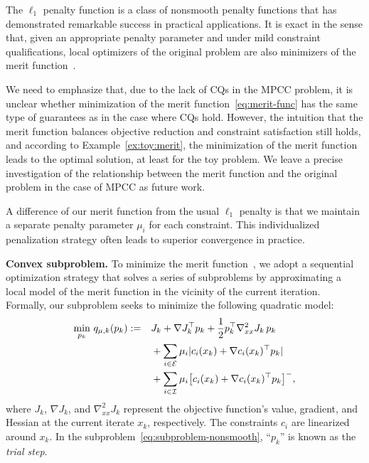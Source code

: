 
\begin{remark}
    The $\ell_1$ penalty function is a class of nonsmooth penalty functions that has demonstrated remarkable success in practical applications. It is exact in the sense that, given an appropriate penalty parameter and under mild constraint qualifications, local optimizers of the original problem are also minimizers of the merit function~\cite{Fletcher1983}.

    We need to emphasize that, due to the lack of CQs in the MPCC problem, it is unclear whether minimization of the merit function~\eqref{eq:merit-func} has the same type of guarantees as in the case where CQs hold. However, the intuition that the merit function balances objective reduction and constraint satisfaction still holds, and according to Example~\ref{ex:toy:merit}, the minimization of the merit function leads to the optimal solution, at least for the toy problem. We leave a precise investigation of the relationship between the merit function and the original problem in the case of MPCC as future work.
    

    A difference of our merit function from the usual $\ell_1$ penalty is that we maintain a separate penalty parameter $\mu_i$ for each constraint. This individualized penalization strategy often leads to superior convergence in practice.

\end{remark}

\textbf{Convex subproblem.} 
To minimize the merit function~, we adopt a sequential optimization strategy that solves a series of subproblems by approximating a local model of the merit function in the vicinity of the current iteration. Formally, our subproblem seeks to minimize the following quadratic model:
\begin{align}\label{eq:subproblem-nonsmooth}
\min_{p_k} \, q_{\mu,k}(p_k) := & \quad J_k + \nabla J_k^\top p_k 
+ \frac{1}{2} p_k^\top \nabla^2_{xx} J_k \, p_k 
\notag\\
&\quad + \sum_{i \in \mathcal{E}}\mu_i \lvert c_i(x_k) + \nabla c_i(x_k)^\top p_k \rvert \notag\\ &\quad + \sum_{i \in {\cal I}}\mu_i  \big[c_i(x_k) + \nabla c_i(x_k)^\top p_k\big]^-,
\end{align}
where $J_k$, $\nabla J_k$, and $\nabla_{xx}^2 J_k$ represent the objective function's value, gradient, and Hessian at the current iterate $x_k$, respectively. The constraints $c_i$ are linearized around $x_k$. In the subproblem~\eqref{eq:subproblem-nonsmooth}, ``$p_k$'' is known as the \emph{trial step}.

